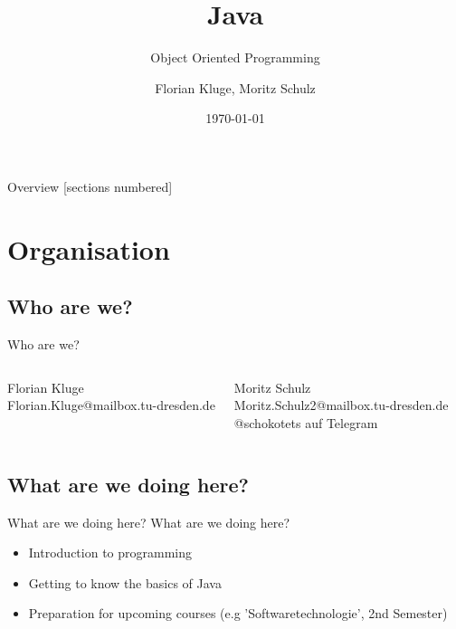 

\usepackage{tikz}
\usepackage{hyperref}
\hypersetup{
	colorlinks=true,
	linkcolor=darkgray,
	urlcolor=blue,
}


\title{Java}
\subtitle{Object Oriented  Programming}
\date{\today}
\author{Florian Kluge, Moritz Schulz}


\maketitle


\begin{frame}{Overview}
	[sections numbered]
	\tableofcontents[hideallsubsections]
\end{frame}




\section{Organisation}

\subsection{Who are we?}
\begin{frame}{Who are we?}

	\begin{columns}
		Florian Kluge\\
		Florian.Kluge@mailbox.tu-dresden.de



		Moritz Schulz\\
		Moritz.Schulz2@mailbox.tu-dresden.de\\
		@schokotets auf Telegram

	\end{columns}

\end{frame}

\subsection{What are we doing here?}
\begin{frame}{What are we doing here?}
	What are we doing here?
	\begin{itemize}
		\item Introduction to programming
		\item Getting to know the basics of Java
		\item Preparation for upcoming courses (e.g 'Softwaretechnologie', 2nd Semester)
	\end{itemize}
\end{frame}

